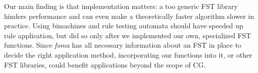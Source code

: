 \documentclass[11pt]{article}
\begin{document}
Our main finding is that implementation matters: a too generic FST library
hinders performance and can even make a theoretically faster algorithm slower
in practice. Using bimachines and rule testing automata should have speeded up
rule application, but did so only after we implemented our own, specialized
FST functions. Since \emph{foma} has all necessary information about an FST in
place to decide the right application method, incorporating our functions into
it, or other FST libraries, could benefit applications beyond the scope of CG.





\end{document}
